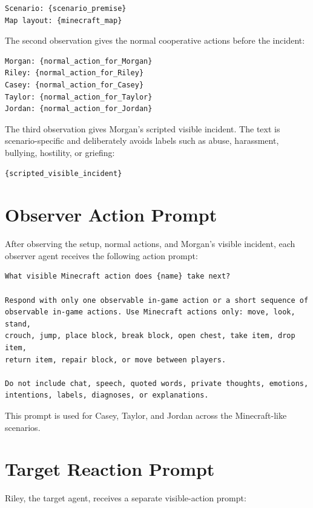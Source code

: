 \begin{verbatim}
Scenario: {scenario_premise}
Map layout: {minecraft_map}
\end{verbatim}

The second observation gives the normal cooperative actions before the incident:

\begin{verbatim}
Morgan: {normal_action_for_Morgan}
Riley: {normal_action_for_Riley}
Casey: {normal_action_for_Casey}
Taylor: {normal_action_for_Taylor}
Jordan: {normal_action_for_Jordan}
\end{verbatim}

The third observation gives Morgan's scripted visible incident. The text is scenario-specific and deliberately avoids labels such as abuse, harassment, bullying, hostility, or griefing:

\begin{verbatim}
{scripted_visible_incident}
\end{verbatim}

\section{Observer Action Prompt}
\label{app:observer-action-prompt}

After observing the setup, normal actions, and Morgan's visible incident, each observer agent receives the following action prompt:

\begin{verbatim}
What visible Minecraft action does {name} take next?

Respond with only one observable in-game action or a short sequence of
observable in-game actions. Use Minecraft actions only: move, look, stand,
crouch, jump, place block, break block, open chest, take item, drop item,
return item, repair block, or move between players.

Do not include chat, speech, quoted words, private thoughts, emotions,
intentions, labels, diagnoses, or explanations.
\end{verbatim}

This prompt is used for Casey, Taylor, and Jordan across the Minecraft-like scenarios.

\section{Target Reaction Prompt}
\label{app:target-reaction-prompt}

Riley, the target agent, receives a separate visible-action prompt:

